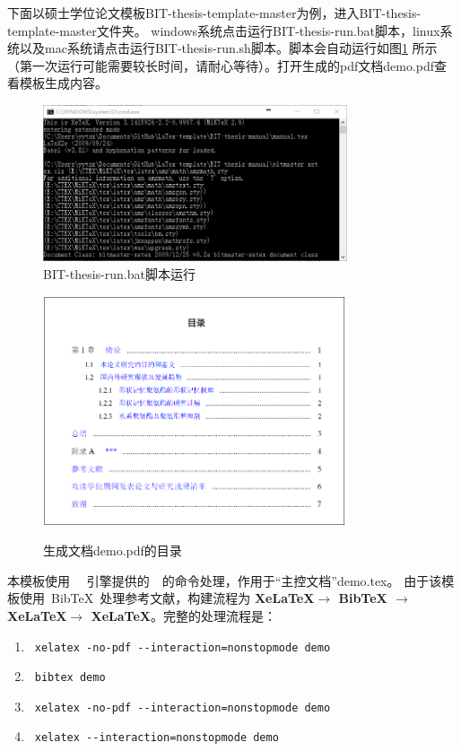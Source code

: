 下面以硕士学位论文模板BIT-thesis-template-master为例，进入BIT-thesis-template-master文件夹。
windows系统点击运行BIT-thesis-run.bat脚本，linux系统以及mac系统请点击运行BIT-thesis-run.sh脚本。脚本会自动运行如图\ref{fig:run} 所示（第一次运行可能需要较长时间，请耐心等待）。打开生成的pdf文档demo.pdf查看模板生成内容。
 
\begin{figure}[!htp]
  \centering
  \includegraphics[width=0.8\textwidth]{figures/BIT-thesis-run}
  \caption{BIT-thesis-run.bat脚本运行}
  \label{fig:run}
\end{figure}


\begin{figure}[!htp]
  \centering
  {\includegraphics[width=0.8\textwidth]{figures/demo_context}}
  \caption{生成文档demo.pdf的目录}
  \label{fig:demo_context}
\end{figure}

本模板使用~\XeTeX~ 引擎提供的~\XeLaTeX~的命令处理，作用于“主控文档”demo.tex。
由于该模板使用~{{\sc Bib}\TeX}~处理参考文献，构建流程为 \textbf{XeLaTeX$\rightarrow$ BibTeX $\rightarrow$ XeLaTeX$\rightarrow$ XeLaTeX}。完整的处理流程是：

{\color{blue}
\begin{enumerate}
\item[] ~\verb|xelatex -no-pdf --interaction=nonstopmode demo|
\item[] ~\verb|bibtex demo| 
\item[] ~\verb|xelatex -no-pdf --interaction=nonstopmode demo|
\item[] ~\verb|xelatex --interaction=nonstopmode demo|
\end{enumerate}}


